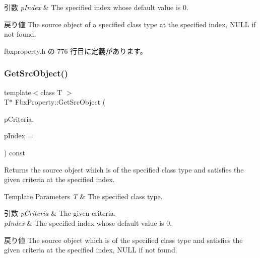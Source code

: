 \begin{DoxyParams}{引数}
{\em p\+Index} & The specified index whose default value is 0. \\
\hline
\end{DoxyParams}
\begin{DoxyReturn}{戻り値}
The source object of a specified class type at the specified index, N\+U\+LL if not found. 
\end{DoxyReturn}


 fbxproperty.\+h の 776 行目に定義があります。

\mbox{\label{class_fbx_property_ac8ef2f7e7ea3fbfc19ca6202d4b8faf7}} 
\subsubsection{\texorpdfstring{Get\+Src\+Object()}{GetSrcObject()}\hspace{0.1cm}{\footnotesize\ttfamily [4/4]}}
{\footnotesize\ttfamily template$<$class T $>$ \\
T$\ast$ Fbx\+Property\+::\+Get\+Src\+Object (\begin{DoxyParamCaption}\item[{const \hyperlink{class_fbx_criteria}{Fbx\+Criteria} \&}]{p\+Criteria,  }\item[{const int}]{p\+Index = {} }\end{DoxyParamCaption}) const\hspace{0.3cm}{\ttfamily [inline]}}

Returns the source object which is of the specified class type and satisfies the given criteria at the specified index. 
\begin{DoxyTemplParams}{Template Parameters}
{\em T} & The specified class type. \\
\hline
\end{DoxyTemplParams}

\begin{DoxyParams}{引数}
{\em p\+Criteria} & The given criteria. \\
\hline
{\em p\+Index} & The specified index whose default value is 0. \\
\hline
\end{DoxyParams}
\begin{DoxyReturn}{戻り値}
The source object which is of the specified class type and satisfies the given criteria at the specified index, N\+U\+LL if not found. 
\end{DoxyReturn}


